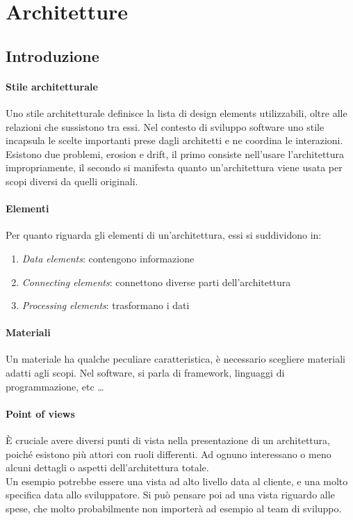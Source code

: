 \section{Architetture}
\subsection{Introduzione}

\paragraph{Stile architetturale}
Uno stile architetturale definisce la lista di design elements utilizzabili, 
oltre alle relazioni che sussistono tra essi. Nel contesto di sviluppo software 
uno stile incapsula le scelte importanti prese dagli architetti e ne coordina le 
interazioni.
Esistono due problemi, erosion e drift, il primo consiste nell'usare l'architettura 
impropriamente, il secondo si manifesta quanto un'architettura viene usata per scopi 
diversi da quelli originali.

\paragraph{Elementi}
Per quanto riguarda gli elementi di un'architettura, essi si suddividono in:
\begin{enumerate}
    \item \emph{Data elements}: contengono informazione
    \item \emph{Connecting elements}: connettono diverse parti dell'architettura
    \item \emph{Processing elements}: trasformano i dati
\end{enumerate}

\paragraph{Materiali}
Un materiale ha qualche peculiare caratteristica, è necessario scegliere materiali
adatti agli scopi. Nel software, si parla di framework, linguaggi di programmazione, etc \dots

\paragraph{Point of views}
È cruciale avere diversi punti di vista nella presentazione di un architettura, poiché 
esistono più attori con ruoli differenti.
Ad ognuno interessano o meno alcuni dettagli o aspetti dell'architettura totale.\\
Un esempio potrebbe essere una vista ad alto livello data al cliente, e una molto specifica 
data allo sviluppatore.
Si può pensare poi ad una vista riguardo alle spese, che molto probabilmente non importerà 
ad esempio al team di sviluppo. 

